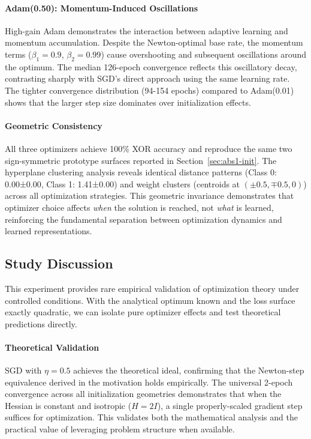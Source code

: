 \paragraph{Adam(0.50): Momentum-Induced Oscillations}
High-gain Adam demonstrates the interaction between adaptive learning and momentum accumulation. Despite the Newton-optimal base rate, the momentum terms ($\beta_1=0.9$, $\beta_2=0.99$) cause overshooting and subsequent oscillations around the optimum. The median 126-epoch convergence reflects this oscillatory decay, contrasting sharply with SGD's direct approach using the same learning rate. The tighter convergence distribution (94-154 epochs) compared to Adam(0.01) shows that the larger step size dominates over initialization effects.

\paragraph{Geometric Consistency}
All three optimizers achieve 100\% XOR accuracy and reproduce the same two sign-symmetric prototype surfaces reported in Section~\ref{sec:abs1-init}. The hyperplane clustering analysis reveals identical distance patterns (Class 0: 0.00±0.00, Class 1: 1.41±0.00) and weight clusters (centroids at $(\pm0.5, \mp0.5, 0)$) across all optimization strategies. This geometric invariance demonstrates that optimizer choice affects \emph{when} the solution is reached, not \emph{what} is learned, reinforcing the fundamental separation between optimization dynamics and learned representations.


\subsection*{Study Discussion}

This experiment provides rare empirical validation of optimization theory under controlled conditions. With the analytical optimum known and the loss surface exactly quadratic, we can isolate pure optimizer effects and test theoretical predictions directly.

\paragraph{Theoretical Validation}
SGD with $\eta=0.5$ achieves the theoretical ideal, confirming that the Newton-step equivalence derived in the motivation holds empirically. The universal 2-epoch convergence across all initialization geometries demonstrates that when the Hessian is constant and isotropic ($H = 2I$), a single properly-scaled gradient step suffices for optimization. This validates both the mathematical analysis and the practical value of leveraging problem structure when available.


